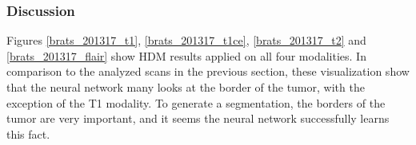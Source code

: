 \subsubsection{Discussion}
Figures \ref{brats_201317_t1}, \ref{brats_201317_t1ce}, \ref{brats_201317_t2} and \ref{brats_201317_flair} show HDM results applied on all four modalities. In comparison to the analyzed scans in the previous section, these visualization show that the neural network many looks at the border of the tumor, with the exception of the T1 modality. To generate a segmentation, the borders of the tumor are very important, and it seems the neural network successfully learns this fact.